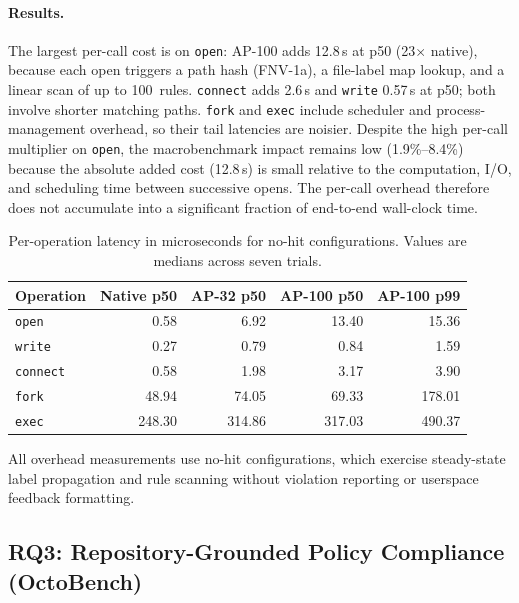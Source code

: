 \paragraph{Results.}
The largest per-call cost is on \texttt{open}: AP-100 adds
12.8\,\textmu s at p50 (23$\times$ native), because each open triggers a
path hash (FNV-1a), a file-label map lookup, and a linear scan of up to
100~rules. \texttt{connect} adds 2.6\,\textmu s and \texttt{write}
0.57\,\textmu s at p50; both involve shorter matching paths.
\texttt{fork} and \texttt{exec} include scheduler and process-management
overhead, so their tail latencies are noisier. Despite the high per-call
multiplier on \texttt{open}, the macrobenchmark impact remains low
(1.9\%--8.4\%) because the absolute added cost (12.8\,\textmu s) is
small relative to the computation, I/O, and scheduling time between
successive opens. The per-call overhead therefore does not accumulate
into a significant fraction of end-to-end wall-clock time.

\begin{table}[tb]\small
\centering
\caption{Per-operation latency in microseconds for no-hit configurations.
Values are medians across seven trials.}
\label{tab:micro-latency}
\begin{tabular}{lrrrr}
\toprule
Operation & Native p50 & AP-32 p50 & AP-100 p50 & AP-100 p99 \\
\midrule
\texttt{open}    & 0.58 & 6.92 & 13.40 & 15.36 \\
\texttt{write}   & 0.27 & 0.79 & 0.84  & 1.59 \\
\texttt{connect} & 0.58 & 1.98 & 3.17  & 3.90 \\
\texttt{fork}    & 48.94 & 74.05 & 69.33 & 178.01 \\
\texttt{exec}    & 248.30 & 314.86 & 317.03 & 490.37 \\
\bottomrule
\end{tabular}
\end{table}

All overhead measurements use no-hit configurations, which exercise steady-state
label propagation and rule scanning without violation reporting or
userspace feedback formatting.

\subsection{RQ3: Repository-Grounded Policy Compliance (OctoBench)}
\label{sec:eval:rq3}

